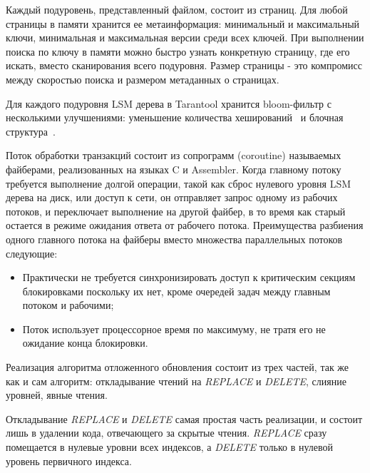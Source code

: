 \documentclass[a4paper,hidelinks,12pt]{article}
\begin{document}
Каждый подуровень, представленный файлом, состоит из страниц. Для любой страницы
в памяти хранится ее метаинформация: минимальный и максимальный ключи,
минимальная и максимальная версии среди всех ключей. При выполнении поиска по
ключу в памяти можно быстро узнать конкретную страницу, где его искать, вместо
сканирования всего подуровня. Размер страницы - это компромисс между скоростью
поиска и размером метаданных о страницах.

Для каждого подуровня LSM дерева в Tarantool хранится bloom-фильтр с несколькими
улучшениями: уменьшение количества хеширований~\cite{bloom_less_hashing} и
блочная структура~\cite{bloom_blocked}.

Поток обработки транзакций состоит из сопрограмм (coroutine) называемых
файберами, реализованных на языках C и Assembler. Когда главному потоку
требуется выполнение долгой операции, такой как сброс нулевого уровня LSM дерева
на диск, или доступ к сети, он отправляет запрос одному из рабочих потоков, и
переключает выполнение на другой файбер, в то время как старый остается в режиме
ожидания ответа от рабочего потока. Преимущества разбиения одного главного
потока на файберы вместо множества параллельных потоков следующие:
\begin{itemize}
\item Практически не требуется синхронизировать доступ к критическим секциям
блокировками поскольку их нет, кроме очередей задач между главным потоком и
рабочими;
\item Поток использует процессорное время по максимуму, не тратя его не ожидание
конца блокировки.
\end{itemize}

Реализация алгоритма отложенного обновления состоит из трех частей, так же как и
сам алгоритм: откладывание чтений на \textit{REPLACE} и \textit{DELETE},
слияние уровней, явные чтения.

Откладывание \textit{REPLACE} и \textit{DELETE} самая простая часть реализации,
и состоит лишь в удалении кода, отвечающего за скрытые чтения. \textit{REPLACE}
сразу помещается в нулевые уровни всех индексов, а \textit{DELETE} только в
нулевой уровень первичного индекса.
\end{document}
